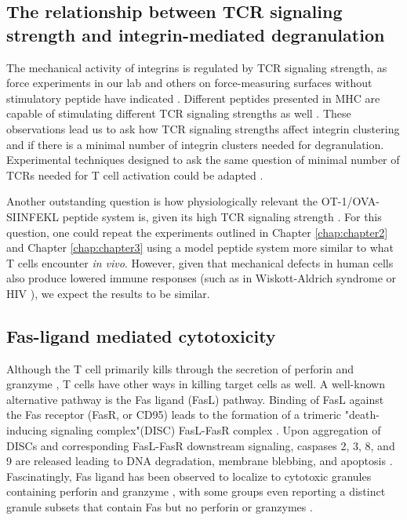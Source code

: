 \subsection{The relationship between TCR signaling strength and integrin-mediated degranulation}

The mechanical activity of integrins is regulated by TCR signaling strength, as  force experiments in our lab and others on force-measuring surfaces without stimulatory peptide have indicated \cite{Ma2012, Feng2018, Chen2013, Harrison2019}. Different peptides presented in MHC are capable of stimulating different TCR signaling strengths as well \cite{Moran2011}. These observations lead us to ask how TCR signaling strengths affect integrin clustering and if there is a minimal number of integrin clusters needed for degranulation. Experimental techniques designed to ask the same question of minimal number of TCRs needed for T cell activation could be adapted \cite{Hashimoto-Tane2016, Labrecque2001, Manz2011}. 

Another outstanding question is how physiologically relevant the OT-1/OVA-SIINFEKL peptide system is, given its high TCR signaling strength \cite{Moran2011}. For this question, one could repeat the experiments outlined in Chapter \ref{chap:chapter2} and Chapter \ref{chap:chapter3} using a model peptide system more similar to what T cells encounter \textit{in vivo}. However, given that mechanical defects in human cells also produce lowered immune responses (such as in Wiskott-Aldrich syndrome or HIV \cite{Houmadi2018}), we expect the results to be similar.

\subsection{Fas-ligand mediated cytotoxicity}

Although the T cell primarily kills through the secretion of perforin and granzyme \cite{Yasukawa2000}, T cells have other ways in killing target cells as well. A well-known alternative pathway is the Fas ligand (FasL) pathway.  Binding of FasL against the Fas receptor (FasR, or CD95) leads to the formation of a trimeric "death-inducing signaling complex"(DISC) FasL-FasR complex \cite{Yamada2017}. Upon aggregation of DISCs and corresponding FasL-FasR downstream signaling,  caspases 2, 3, 8, and 9 are released leading to DNA degradation, membrane blebbing, and apoptosis \cite{Parlato2000, Yamada2017}. Fascinatingly, Fas ligand has been observed to localize to cytotoxic granules containing perforin and granzyme \cite{Kojima2002}, with some groups even reporting a distinct granule subsets that contain Fas but no perforin or granzymes \cite{Chang2017, Schmidt2011, Schmidt2011_2}. 

